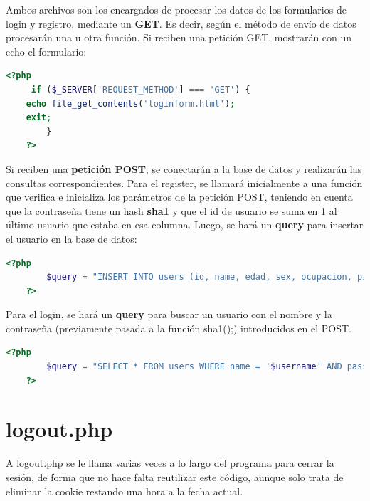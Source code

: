 \documentclass[a4paper, 12pt]{report}
\begin{document}
    Ambos archivos son los encargados de procesar los datos de los formularios de login y registro, mediante un \textbf{GET}.
    Es decir, según el método de envío de datos procesarán una u otra función. Si reciben una petición GET,
    mostrarán con un echo el formulario:

    \begin{lstlisting}[style=ruled, language=php, caption={Manejo de peticiones GET de login.php y register.php.},
        gobble=4]
    <?php
     if ($_SERVER['REQUEST_METHOD'] === 'GET') {
    echo file_get_contents('loginform.html');
    exit;
        }
    ?>
    \end{lstlisting}

    Si reciben una \textbf{petición POST}, se conectarán a la base de datos y realizarán las consultas
    correspondientes. Para el register, se llamará inicialmente a una función que verifica e inicializa los parámetros de la petición POST,
    teniendo en cuenta que la contraseña tiene un hash \textbf{sha1} y que el id de usuario se suma en 1 al último
    usuario que estaba en esa columna. Luego, se hará un \textbf{query} para insertar el usuario en la base de datos:

    \begin{lstlisting}[style=ruled, language=php, caption={Query de register.php.}, gobble=4]
    <?php
        $query = "INSERT INTO users (id, name, edad, sex, ocupacion, pic, passwd ) VALUES ($params[0], '$params[1]', $params[2], '$params[3]', '$params[4]', '$params[5]', '$params[6]')";
    ?>
    \end{lstlisting}

    Para el login, se hará un \textbf{query} para buscar un usuario con el nombre y la contraseña (previamente
    pasada a la función sha1();) introducidos en el POST.

    \begin{lstlisting}[style=ruled, language=php, caption={Query de login.php.}, gobble=4]
    <?php
        $query = "SELECT * FROM users WHERE name = '$username' AND passwd = '$password'";
    ?>
    \end{lstlisting}

    \section{logout.php}

    A logout.php se le llama varias veces a lo largo del programa para cerrar la sesión, de forma que no hace falta
    reutilizar este código, aunque solo trata de eliminar la cookie restando una hora a la fecha actual.
\end{document}
